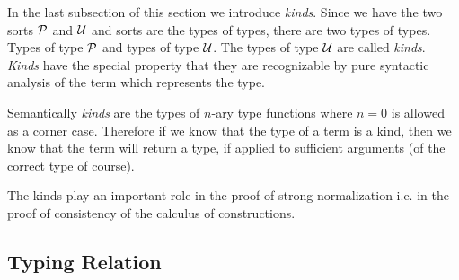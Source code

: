 In the last subsection of this section we introduce \emph{kinds}. Since we have
the two sorts ${\cal P}$ and ${\cal U}$ and sorts are the types of types, there are two
types of types. Types of type ${\cal P}$ and types of type ${\cal U}$. The types of
type ${\cal U}$ are called \emph{kinds}. \emph{Kinds} have the special property that
they are recognizable by pure syntactic analysis of the term which represents
the type.

Semantically \emph{kinds} are the types of $n$-ary type functions where $n = 0$
is allowed as a corner case. Therefore if we know that the type of a term is a
kind, then we know that the term will return a type, if applied to sufficient
arguments (of the correct type of course).

The kinds play an important role in the proof of strong normalization i.e. in
the proof of consistency of the calculus of constructions.






\subsection{Typing Relation}

